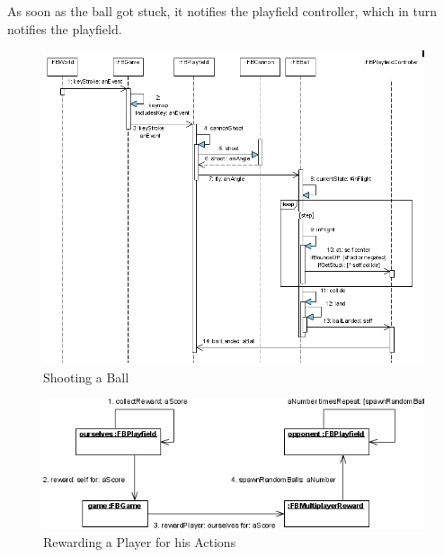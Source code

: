 As soon as the ball got stuck, it notifies the playfield controller, which in turn notifies
the playfield.
%
\begin{figure}[bt]
  \begin{center}
    \includegraphics[width=\linewidth]{images/ShootingABall.png}
  \end{center}
  \caption{Shooting a Ball}
  \label{fig:ShootingABall}
\end{figure}
%
%
\begin{figure}[bt]
  \begin{center}
    \includegraphics[width=\linewidth]{images/RewardingAPlayer.png}
  \end{center}
  \caption{Rewarding a Player for his Actions}
  \label{fig:RewardingAPlayer}
\end{figure}
%